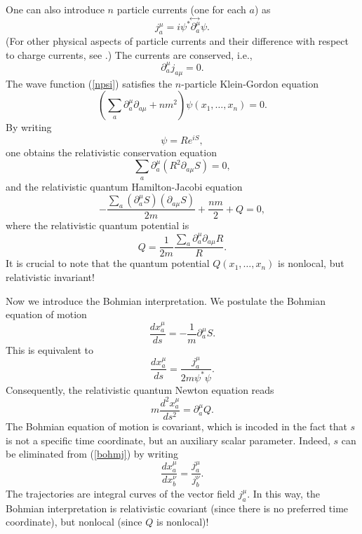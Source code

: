 \documentclass[10pt,twoside]{aipproc} %
\begin{document}
One can also introduce $n$ particle currents (one for each $a$) as
\begin{equation}
j^{\mu}_a=i\psi^* \!\stackrel{\leftrightarrow\;}{\partial^{\mu}_a}\! \psi .
\end{equation}
(For other physical aspects of particle currents and their difference 
with respect to charge currents, see \cite{nikolplb,nikolijmpd,nikolgrg}.)
The currents are conserved, i.e., 
\begin{equation}
\partial^{\mu}_a j_{a\mu}=0 .
\end{equation}
The wave function (\ref{npsi}) satisfies the
$n$-particle Klein-Gordon equation
\begin{equation}
\left( \sum_a\partial_a^{\mu}\partial_{a\mu}+nm^2 \right) 
\psi(x_1,\ldots ,x_n)=0 .
\end{equation}
By writing
\begin{equation}
\psi=Re^{iS} ,
\end{equation}
one obtains the
relativistic conservation equation
\begin{equation}
\sum_a\partial_a^{\mu}(R^2\partial_{a\mu}S)=0,
\end{equation}
and the
relativistic quantum Hamilton-Jacobi equation
\begin{equation}
-\frac{\sum_a(\partial_a^{\mu}S)(\partial_{a\mu}S)}{2m} +\frac{nm}{2} +Q=0 ,
\end{equation}
where the
relativistic quantum potential is
\begin{equation}
Q=\frac{1}{2m}\frac{\sum_a\partial_a^{\mu}\partial_{a\mu}R}{R} .
\end{equation}
It is crucial to note that the quantum potential
$Q(x_1,\ldots ,x_n)$ is nonlocal, but relativistic invariant! 

Now we introduce the Bohmian interpretation. We postulate
the Bohmian equation of motion 
\begin{equation}
\frac{dx_a^{\mu}}{ds} = -\frac{1}{m}\partial_a^{\mu}S . 
\end{equation}
This is equivalent to
\begin{equation}\label{bohmj}
\frac{dx_a^{\mu}}{ds} = \frac{j_a^{\mu}}{2m\psi^*\psi} .
\end{equation}
Consequently, the
relativistic quantum Newton equation reads
\begin{equation}
m\frac{d^2x_a^{\mu}}{ds^2}=\partial_a^{\mu}Q .
\end{equation}
The Bohmian equation of motion is covariant, which is
incoded in the fact that
$s$ is not a specific time coordinate, but an auxiliary 
scalar parameter.
Indeed, $s$ can be eliminated 
from (\ref{bohmj}) by writing
\begin{equation}
\frac{dx_a^{\mu}}{dx_b^{\nu}} = \frac{j_a^{\mu}}{j_b^{\nu}} .
\end{equation}
The trajectories are integral curves of the vector field 
${j_a^{\mu}}$. In this way, 
the Bohmian interpretation is relativistic covariant (since there is no 
preferred time coordinate), but nonlocal (since $Q$ is nonlocal)! 
\end{document}
